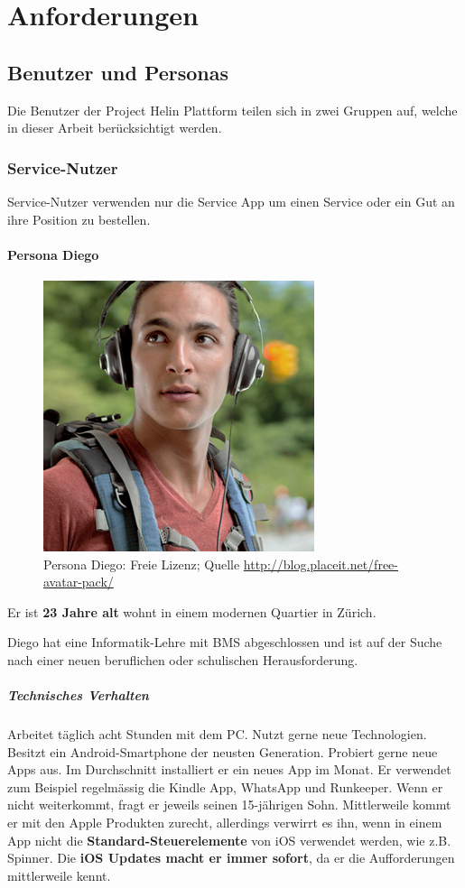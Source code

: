\chapter{Anforderungen}

\section{Benutzer und Personas}


Die Benutzer der Project Helin Plattform teilen sich in zwei Gruppen auf, welche in dieser Arbeit berücksichtigt werden.

\subsection{Service-Nutzer}

Service-Nutzer verwenden nur die Service App um einen Service oder ein Gut an ihre Position zu bestellen. 

\subsubsection{Persona Diego}

\begin{figure}
\includegraphics[width=.35\textwidth]{images/persona-diego.jpg} 
\caption{Persona Diego: Freie Lizenz; Quelle \url{http://blog.placeit.net/free-avatar-pack/}}
\label{fig:diego}
\end{figure}

Er ist \textbf{23 Jahre alt} wohnt in einem modernen Quartier in Zürich.

Diego hat eine Informatik-Lehre mit BMS abgeschlossen und ist auf der Suche nach einer neuen beruflichen oder schulischen Herausforderung.

\paragraph{Technisches Verhalten} 

Arbeitet täglich acht Stunden mit dem PC. Nutzt gerne neue Technologien. Besitzt ein Android-Smartphone der neusten Generation. Probiert gerne neue Apps aus. Im Durchschnitt installiert er ein neues App im Monat. Er verwendet zum Beispiel regelmässig die Kindle App, WhatsApp und Runkeeper. Wenn er nicht weiterkommt, fragt er jeweils seinen 15-jährigen Sohn. Mittlerweile kommt er mit den Apple Produkten zurecht, allerdings verwirrt es ihn, wenn in einem App nicht die \textbf{Standard-Steuerelemente} von iOS verwendet werden, wie z.B. Spinner. Die \textbf{iOS Updates macht er immer sofort}, da er die Aufforderungen mittlerweile kennt.\\

